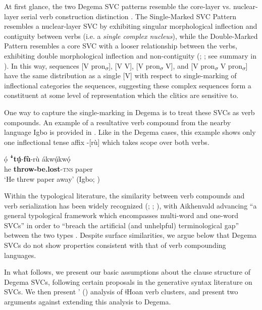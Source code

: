 \documentclass[output=paper]{langsci/langscibook}
\begin{document}
At first glance, the two Degema SVC patterns resemble the core-layer vs. nuclear-layer serial verb construction distinction \citep{FoleyOlson1985}. The Single-Marked SVC Pattern resembles a nuclear-layer SVC by exhibiting singular morphological inflection and contiguity between verbs (i.e. a \textit{single complex nucleus}), while the Double-Marked Pattern resembles a core SVC with a looser relationship between the verbs, exhibiting double morphological inflection and non-contiguity (\citealt[37--39]{FoleyOlson1985}; \citealt{Crowley2002}; see summary in \citealt[126-129]{ClearyKemp2015}). In this way, sequences [V pron\textsubscript{$\sigma $}], [V V], [V pron\textsubscript{$\sigma $} V], and [V pron\textsubscript{$\sigma $} V pron\textsubscript{$\sigma $}] have the same distribution as a single [V] with respect to single-marking of inflectional categories the sequences, suggesting these complex sequences form a constituent at some level of representation which the clitics are sensitive to. 

One way to capture the single-marking in Degema is to treat these SVCs as verb compounds. An example of a resultative verb compound from the nearby language Igbo is provided in . Like in the Degema cases, this example shows only one inflectional tense affix -[rù] which takes scope over both verbs.


\ea\label{ex:rolle:34}
\gll  ọ́    ꜜ\textbf{tụ́}{}-\textbf{fù}{}-rù      ákwụ́kwọ́\\
     he  \textbf{throw-be.lost}{}-\textsc{tns}  paper\\
\glt ‘He threw paper away’ (Igbo; \citealt{Lord1975})
\z

Within the typological literature, the similarity between verb compounds and verb serialization has been widely recognized (\citealt[101]{Margetts1999}; \citealt[18]{Crowley2002}; \citealt[a.o.]{Aikhenvald2006}), with Aikhenvald advancing “a general typological framework which encompasses multi-word and one-word SVCs” in order to “breach the artificial (and unhelpful) terminological gap” between the two types \citep[38]{Aikhenvald2006}. Despite surface similarities, we argue below that Degema SVCs do not show properties consistent with that of verb compounding languages. 

In what follows, we present our basic assumptions about the clause structure of Degema SVCs, following certain proposals in the generative syntax literature on SVCs. We then present \citeauthor{Collins2002}’ (\citeyear*{collins2002}) analysis of ǂHoan verb clusters, and present two arguments against extending this analysis to Degema. 
\end{document}
